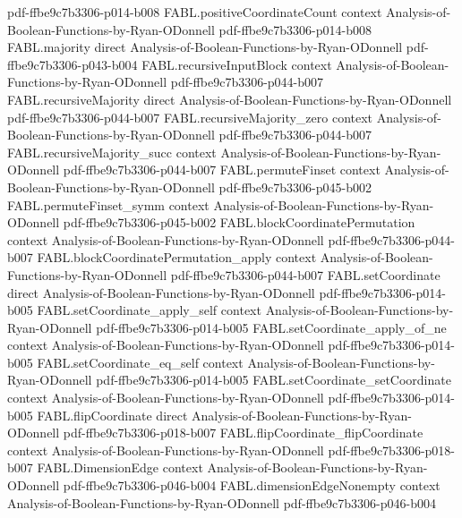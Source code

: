 \begin{theorem}
  {pdf-ffbe9c7b3306-p014-b008}
\proofstep
  {FABL.positiveCoordinateCount}
  {context}
  {Analysis-of-Boolean-Functions-by-Ryan-ODonnell}
  {pdf-ffbe9c7b3306-p014-b008}
\proofstep
  {FABL.majority}
  {direct}
  {Analysis-of-Boolean-Functions-by-Ryan-ODonnell}
  {pdf-ffbe9c7b3306-p043-b004}
\proofstep
  {FABL.recursiveInputBlock}
  {context}
  {Analysis-of-Boolean-Functions-by-Ryan-ODonnell}
  {pdf-ffbe9c7b3306-p044-b007}
\proofstep
  {FABL.recursiveMajority}
  {direct}
  {Analysis-of-Boolean-Functions-by-Ryan-ODonnell}
  {pdf-ffbe9c7b3306-p044-b007}
\proofstep
  {FABL.recursiveMajority_zero}
  {context}
  {Analysis-of-Boolean-Functions-by-Ryan-ODonnell}
  {pdf-ffbe9c7b3306-p044-b007}
\proofstep
  {FABL.recursiveMajority_succ}
  {context}
  {Analysis-of-Boolean-Functions-by-Ryan-ODonnell}
  {pdf-ffbe9c7b3306-p044-b007}
\proofstep
  {FABL.permuteFinset}
  {context}
  {Analysis-of-Boolean-Functions-by-Ryan-ODonnell}
  {pdf-ffbe9c7b3306-p045-b002}
\proofstep
  {FABL.permuteFinset_symm}
  {context}
  {Analysis-of-Boolean-Functions-by-Ryan-ODonnell}
  {pdf-ffbe9c7b3306-p045-b002}
\proofstep
  {FABL.blockCoordinatePermutation}
  {context}
  {Analysis-of-Boolean-Functions-by-Ryan-ODonnell}
  {pdf-ffbe9c7b3306-p044-b007}
\proofstep
  {FABL.blockCoordinatePermutation_apply}
  {context}
  {Analysis-of-Boolean-Functions-by-Ryan-ODonnell}
  {pdf-ffbe9c7b3306-p044-b007}
\proofstep
  {FABL.setCoordinate}
  {direct}
  {Analysis-of-Boolean-Functions-by-Ryan-ODonnell}
  {pdf-ffbe9c7b3306-p014-b005}
\proofstep
  {FABL.setCoordinate_apply_self}
  {context}
  {Analysis-of-Boolean-Functions-by-Ryan-ODonnell}
  {pdf-ffbe9c7b3306-p014-b005}
\proofstep
  {FABL.setCoordinate_apply_of_ne}
  {context}
  {Analysis-of-Boolean-Functions-by-Ryan-ODonnell}
  {pdf-ffbe9c7b3306-p014-b005}
\proofstep
  {FABL.setCoordinate_eq_self}
  {context}
  {Analysis-of-Boolean-Functions-by-Ryan-ODonnell}
  {pdf-ffbe9c7b3306-p014-b005}
\proofstep
  {FABL.setCoordinate_setCoordinate}
  {context}
  {Analysis-of-Boolean-Functions-by-Ryan-ODonnell}
  {pdf-ffbe9c7b3306-p014-b005}
\proofstep
  {FABL.flipCoordinate}
  {direct}
  {Analysis-of-Boolean-Functions-by-Ryan-ODonnell}
  {pdf-ffbe9c7b3306-p018-b007}
\proofstep
  {FABL.flipCoordinate_flipCoordinate}
  {context}
  {Analysis-of-Boolean-Functions-by-Ryan-ODonnell}
  {pdf-ffbe9c7b3306-p018-b007}
\proofstep
  {FABL.DimensionEdge}
  {context}
  {Analysis-of-Boolean-Functions-by-Ryan-ODonnell}
  {pdf-ffbe9c7b3306-p046-b004}
\proofstep
  {FABL.dimensionEdgeNonempty}
  {context}
  {Analysis-of-Boolean-Functions-by-Ryan-ODonnell}
  {pdf-ffbe9c7b3306-p046-b004}
\proofstep

\end{theorem}
